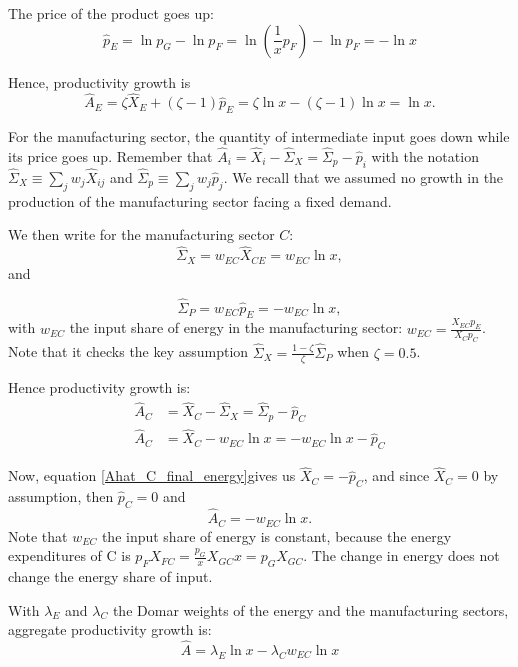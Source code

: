 The price of the product goes up:
\begin{equation}
\hat{p}_E=\ln{p_G}-\ln{p_F}=\ln{\left(\frac{1}{x}p_F\right)}-\ln{p_F}=-\ln{x}
\end{equation}

Hence, productivity growth is
\begin{equation}
\hat{A}_E=\zeta \hat{X}_E+ (\zeta-1)\hat{p}_E=\zeta \ln{x}-(\zeta-1)\ln{x}=\ln{x}. 
\end{equation}

For the manufacturing sector, the quantity of intermediate input goes down while its price goes up. Remember that  $
\hat{A}_i = \hat{X}_i - \hat{\Sigma}_X = \hat{\Sigma}_p - \hat{p}_i$ with the  notation
$
\hat{\Sigma}_X \equiv \sum_j  w_j \hat{X}_{ij}$ and  
$\hat{\Sigma}_p \equiv \sum_j  w_j \hat{p}_{j}$. We recall that we assumed no growth in the production of the manufacturing sector facing a fixed demand.

We then write for the manufacturing sector $C$: 
\begin{equation}
\hat{\Sigma}_X=w_{EC}\hat{X}_{CE}=w_{EC}\ln{x},
\end{equation}
and

\begin{equation}
\hat{\Sigma}_P=w_{EC}\hat{p}_{E}=-w_{EC}\ln{x},
\end{equation}
with $w_{EC}$ the input share of energy in the manufacturing sector: $w_{EC}=\frac{X_{EC}p_E}{X_Cp_C}$. Note that it checks the key assumption $\hat{\Sigma}_X=\frac{1-\zeta}{\zeta}\hat{\Sigma}_P$ when $\zeta=0.5$.

Hence productivity growth is:
\begin{align}
\label{Ahat_C_final_energy}
\hat{A}_C&=\hat{X}_C - \hat{\Sigma}_X = \hat{\Sigma}_p - \hat{p}_C\\
\hat{A}_C&=\hat{X}_C -w_{EC}\ln{x}=-w_{EC}\ln{x}- \hat{p}_C
\end{align}

Now, equation \eqref{Ahat_C_final_energy}gives us $\hat{X}_C=-\hat{p}_C$, and since $\hat{X}_C=0$ by assumption, then $\hat{p}_C=0$ and 
\begin{equation}
\hat{A}_C=-w_{EC}\ln{x}.
\end{equation}
Note that $w_{EC}$ the input share of energy is constant, because the energy expenditures of C is $p_FX_{FC}=\frac{p_G}{x}X_{GC}x=p_GX_{GC}$. The change in energy does not change the energy share of input.

With $\lambda_E$ and $\lambda_C$ the Domar weights of the energy and the manufacturing sectors, aggregate productivity growth is: 
\begin{equation*}
\hat{A}=\lambda_E\ln{x}-\lambda_Cw_{EC}\ln{x}
\end{equation*}

